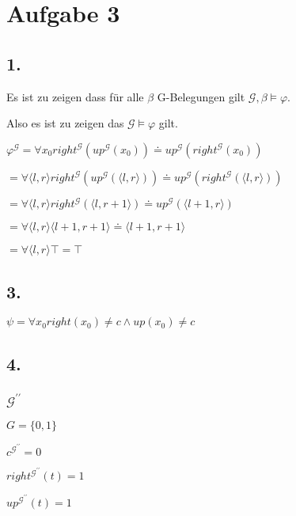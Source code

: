 \section*{Aufgabe 3}

\subsection*{1.}


Es ist zu zeigen dass für alle $\beta$ G-Belegungen gilt $ \mathcal{G},\beta \vDash \varphi$.

Also es ist zu zeigen das $\mathcal{G} \vDash \varphi$ gilt.

$\varphi^\mathcal{G} = \forall x_0 right^\mathcal{G}(up^\mathcal{G}(x_0)) \doteq up^\mathcal{G}(right^\mathcal{G}(x_0))$

$ = \forall \langle l,r \rangle right^\mathcal{G}(up^\mathcal{G}(\langle l,r \rangle)) \doteq up^\mathcal{G}(right^\mathcal{G}(\langle l,r \rangle))$


$ = \forall \langle l,r \rangle right^\mathcal{G}(\langle l,r+1 \rangle) \doteq up^\mathcal{G}(\langle l+1,r \rangle)$

$ = \forall \langle l,r \rangle \langle l+1,r+1 \rangle \doteq \langle l+1,r+1 \rangle$

$= \forall \langle l,r \rangle \top = \top$



\subsection*{3.}

$\psi = \forall x_0  right(x_0) \neq c \wedge up(x_0) \neq c$

\subsection*{4.}

\subsubsection*{$\mathcal{G}^{\prime \prime}$}

$G = \{0,1\}$

$c^{\mathcal{G}^{\prime \prime}} = 0$

$right^{\mathcal{G}^{\prime \prime}}(t) = 1$

$up^{\mathcal{G}^{\prime \prime}}(t) = 1$